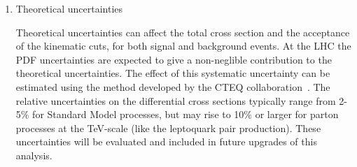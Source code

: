 \begin{enumerate}
\item Theoretical uncertainties 

Theoretical uncertainties can affect the total cross section and the acceptance of the kinematic cuts, for both signal 
and background events. 
At the LHC the PDF uncertainties are expected to give a non-neglible
contribution to the theoretical uncertainties.  
The effect of this systematic uncertainty can be estimated 
using the method developed by the CTEQ collaboration~\cite{PDFRescaling,Martin:2003sk}.
The relative uncertainties on the differential cross sections 
typically range from 2-5\% for Standard Model processes, 
but may rise to 10\% or larger for parton processes at the TeV-scale 
(like the leptoquark pair production).
These uncertainties will be evaluated and included in future upgrades of this analysis.
%
\end{enumerate}
%
%
